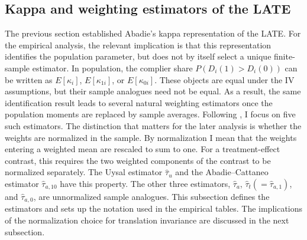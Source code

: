 \documentclass{article}
\begin{document}
\subsection{Kappa and weighting estimators of the LATE}
The previous section established Abadie's kappa representation of the LATE. For
the empirical analysis, the relevant implication is that this representation
identifies the population parameter, but does not by itself select a unique
finite-sample estimator. In population, the complier share
$P(D_i(1)>D_i(0))$ can be written as $E[\kappa_i]$, $E[\kappa_{1i}]$, or
$E[\kappa_{0i}]$. These objects are equal under the IV assumptions, but their
sample analogues need not be equal. As a result, the same identification result
leads to several natural weighting estimators once the population moments are
replaced by sample averages.
Following \citet{sloczynski2025abadie}, I focus on five such estimators. The
distinction that matters for the later analysis is whether the weights are
normalized in the sample. By normalization I mean that the weights entering a
weighted mean are rescaled to sum to one. For a treatment-effect contrast, this
requires the two weighted components of the contrast to be normalized separately.
The Uysal estimator $\hat\tau_u$ and the Abadie--Cattaneo estimator
$\hat\tau_{a,10}$ have this property. The other three estimators,
$\hat\tau_a$, $\hat\tau_t(=\hat\tau_{a,1})$, and $\hat\tau_{a,0}$, are
unnormalized sample analogues. This subsection defines the estimators and sets up
the notation used in the empirical tables. The implications of the normalization
choice for translation invariance are discussed in the next subsection.
\end{document}
